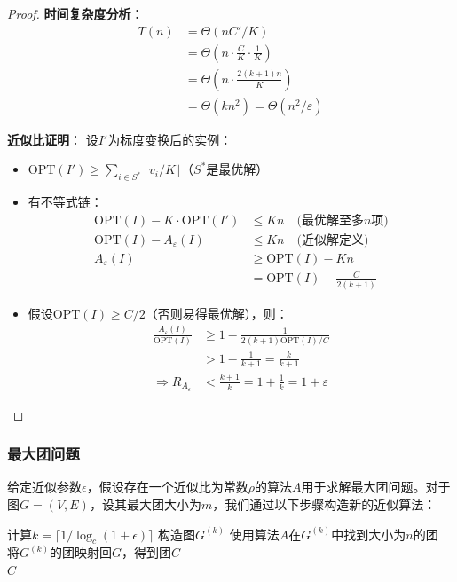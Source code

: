 \documentclass[./../main.tex]{subfiles} %
\begin{document}
\begin{proof}
\textbf{时间复杂度分析}：
\begin{align*}
T(n) &= \Theta(nC'/K) \\
&= \Theta\left(n \cdot \frac{C}{K} \cdot \frac{1}{K}\right) \\
&= \Theta\left(n \cdot \frac{2(k+1)n}{K}\right) \\
&= \Theta(kn^2) = \Theta(n^2/\varepsilon)
\end{align*}

\textbf{近似比证明}：
设$I'$为标度变换后的实例：
\begin{itemize}
    \item $\text{OPT}(I') \geq \sum_{i \in S^*} \lfloor v_i/K \rfloor$（$S^*$是最优解）
    \item 有不等式链：
    \begin{align*}
    \text{OPT}(I) - K \cdot \text{OPT}(I') &\leq Kn \quad \text{(最优解至多$n$项)} \\
    \text{OPT}(I) - A_{\varepsilon}(I) &\leq Kn \quad \text{(近似解定义)} \\
    A_{\varepsilon}(I) &\geq \text{OPT}(I) - Kn \\
    &= \text{OPT}(I) - \frac{C}{2(k+1)} 
    \end{align*}
    
    \item 假设$\text{OPT}(I) \geq C/2$（否则易得最优解），则：
    \begin{align*}
    \frac{A_{\varepsilon}(I)}{\text{OPT}(I)} &\geq 1 - \frac{1}{2(k+1)\text{OPT}(I)/C} \\
    &> 1 - \frac{1}{k+1} = \frac{k}{k+1} \\
    \Rightarrow R_{A_\varepsilon} &< \frac{k+1}{k} = 1 + \frac{1}{k} = 1 + \varepsilon
    \end{align*}
\end{itemize}
\end{proof}

\subsubsection{最大团问题}
给定近似参数$\epsilon$，假设存在一个近似比为常数$\rho$的算法$A$用于求解最大团问题。对于图$G=(V,E)$，设其最大团大小为$m$，我们通过以下步骤构造新的近似算法：

\begin{algorithm}[H]
\caption{完全多项式时间近似模式$A'$}
\BlankLine

计算$k = \lceil 1/\log_c(1+\epsilon) \rceil$  
构造图$G^{(k)}$  
使用算法$A$在$G^{(k)}$中找到大小为$n$的团 \\
将$G^{(k)}$的团映射回$G$，得到团$C$ \\
\Return $C$
\end{algorithm}
\end{document}
